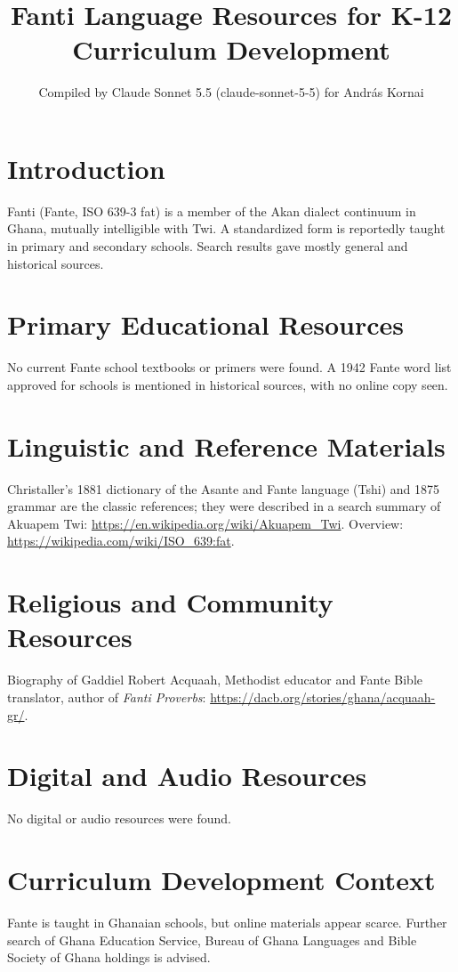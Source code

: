 \documentclass[12pt]{article}
\title{Fanti Language Resources for K-12 Curriculum Development}
\author{Compiled by Claude Sonnet 5.5 (claude-sonnet-5-5) for Andr\'as Kornai}
\date{}
\begin{document}
\maketitle
\section{Introduction}
Fanti (Fante, ISO 639-3 fat) is a member of the Akan dialect continuum in Ghana, mutually intelligible with Twi. A standardized form is reportedly taught in primary and secondary schools. Search results gave mostly general and historical sources.
\section{Primary Educational Resources}
No current Fante school textbooks or primers were found. A 1942 Fante word list approved for schools is mentioned in historical sources, with no online copy seen.
\section{Linguistic and Reference Materials}
Christaller's 1881 dictionary of the Asante and Fante language (Tshi) and 1875 grammar are the classic references; they were described in a search summary of Akuapem Twi: \url{https://en.wikipedia.org/wiki/Akuapem_Twi}. Overview: \url{https://wikipedia.com/wiki/ISO_639:fat}.
\section{Religious and Community Resources}
Biography of Gaddiel Robert Acquaah, Methodist educator and Fante Bible translator, author of \emph{Fanti Proverbs}: \url{https://dacb.org/stories/ghana/acquaah-gr/}.
\section{Digital and Audio Resources}
No digital or audio resources were found.
\section{Curriculum Development Context}
Fante is taught in Ghanaian schools, but online materials appear scarce. Further search of Ghana Education Service, Bureau of Ghana Languages and Bible Society of Ghana holdings is advised.
\end{document}
